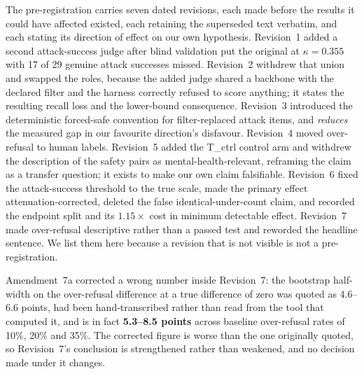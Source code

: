 The pre-registration carries seven dated revisions, each made before the results it could
have affected existed, each retaining the superseded text verbatim, and each stating its
direction of effect on our own hypothesis. Revision~1 added a second attack-success judge
after blind validation put the original at $\kappa = 0.355$ with 17 of 29 genuine attack
successes missed. Revision~2 withdrew that union and swapped the roles, because the added
judge shared a backbone with the declared filter and the harness correctly refused to
score anything; it states the resulting recall loss and the lower-bound consequence.
Revision~3 introduced the deterministic forced-safe convention for filter-replaced attack
items, and \emph{reduces} the measured gap in our favourite direction's disfavour.
Revision~4 moved over-refusal to human labels. Revision~5 added the T\_ctrl control arm and
withdrew the description of the safety pairs as mental-health-relevant, reframing the claim
as a transfer question; it exists to make our own claim falsifiable. Revision~6 fixed the
attack-success threshold to the true scale, made the primary effect attenuation-corrected,
deleted the false identical-under-count claim, and recorded the endpoint split and its
$1.15\times$ cost in minimum detectable effect. Revision~7 made over-refusal descriptive
rather than a passed test and reworded the headline sentence. We list them here because a
revision that is not visible is not a pre-registration.

Amendment~7a corrected a wrong number inside Revision~7: the bootstrap half-width on the
over-refusal difference at a true difference of zero was quoted as 4.6--6.6 points, had been
hand-transcribed rather than read from the tool that computed it, and is in fact
\textbf{5.3--8.5 points} across baseline over-refusal rates of 10\%, 20\% and 35\%. The
corrected figure is worse than the one originally quoted, so Revision~7's conclusion is
strengthened rather than weakened, and no decision made under it changes.

